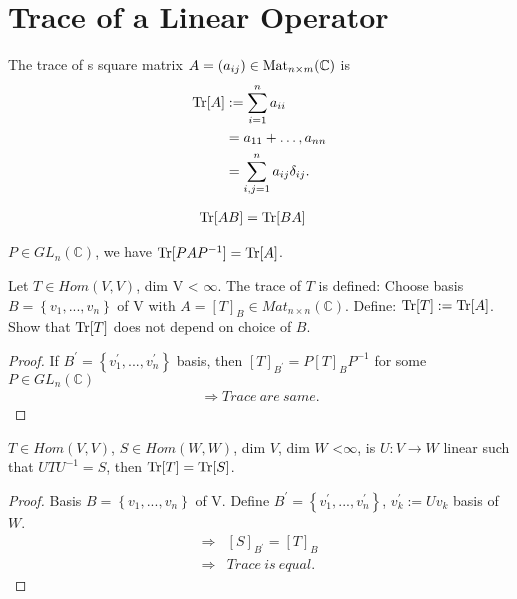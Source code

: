 \documentclass[../../note.tex]{subfiles}
\begin{document}
\section{Trace of a Linear Operator}
\begin{definition}
    The trace of s square matrix $A = (a_{ij}) \in {\rm Mat}_{n \times m}(\mathbb{C})$ is 
    \begin{align}
        \operatorname{Tr}[A]
        &:= \sum_{i=1}^{n} a_{ii} \\
        &= a_{11} + \dots, a_{nn} \\
        &= \sum_{i,j=1}^{n} a_{ij}\delta_{ij}.
    \end{align}
\end{definition}

\begin{lemma}
    \begin{align}
        \operatorname{Tr}[AB] 
        &= \operatorname{Tr}[BA]
    \end{align}
\end{lemma}

\begin{corollary}
    $P \in GL_n(\mathbb{C})$, we have $\operatorname{Tr}[P A P^{-1}] = \operatorname{Tr}[A]$.
\end{corollary}

\begin{lemma}
    Let $T \in Hom(V,V)$, dim V < $\infty$. The trace of $T$ is defined: Choose basis $B = \left\{v_1,...,v_n\right\}$ of V with $A = [T]_B \in Mat_{n \times n}(\mathbb{C})$. Define: $\operatorname{Tr}[T]:= \operatorname{Tr}[A]$. Show that $\operatorname{Tr}[T]$ does not depend on choice of $B$.
\end{lemma}
\begin{proof}
    If $B^\prime = \left\{v_1^\prime, ..., v_n^\prime\right\}$ basis, then $[T]_{B^\prime} = P [T]_B P^{-1}$ for some $P \in GL_n(\mathbb{C})$ 
    \begin{align}
        \Longrightarrow Trace~are~same.
    \end{align}
\end{proof}

\begin{proposition}
    $T \in Hom(V,V)$, $S \in Hom(W,W)$, dim $V$, dim $W$ <$\infty$, is $U: V \rightarrow W$ linear such that $U T U^{-1}=S$, then $\operatorname{Tr}[T] = \operatorname{Tr}[S]$.
\end{proposition}
\begin{proof}
    Basis $B = \left\{v_1,..., v_n\right\}$ of V. Define $B^\prime = \left\{v_1^\prime,..., v_n^\prime\right\}$, $v_k^\prime:= U v_k$ basis of $W$.
    \begin{align}
        \Longrightarrow &[S]_{B^\prime} = [T]_B \\
        \Longrightarrow & Trace~is~equal.
    \end{align}  
\end{proof}
\end{document}
